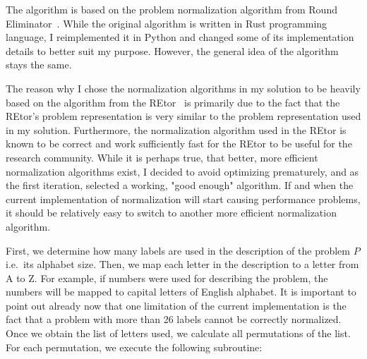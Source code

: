 The algorithm is based on the problem normalization algorithm
from Round Eliminator~\cite{Olivetti2020}. While the original
algorithm is written in Rust programming language, I
reimplemented it in Python and changed some of its
implementation details to better suit my purpose.
However, the general idea of the algorithm stays the same.

The reason why I chose the normalization algorithms in my solution
to be heavily based on the algorithm from the REtor~\cite{Olivetti2020}
is primarily due to
the fact that the REtor's problem representation is very similar to the problem
representation used in my solution. Furthermore, the normalization
algorithm used in the REtor is known to be correct and work
sufficiently fast for the REtor to be useful for the research community.
While it is perhaps true, that better, more efficient normalization
algorithms exist, I decided to avoid optimizing prematurely, and
as the first iteration, selected a working, "good enough" algorithm.
If and when the current implementation of normalization will start
causing performance problems, it should be relatively easy to
switch to another more efficient normalization algorithm.

First, we determine how many labels are used in the description of the
problem $P$ i.e.\ its alphabet size. Then, we map each letter in the description
to a letter from A to Z. For example, if numbers were used for describing
the problem, the numbers will be mapped to capital letters of
English alphabet. It is important to point out already now that
one limitation of the current implementation is the fact that
a problem with more than 26 labels cannot be correctly normalized.
Once we obtain the list of letters used, we calculate all
permutations of the list. For each permutation, we execute the following
subroutine:

